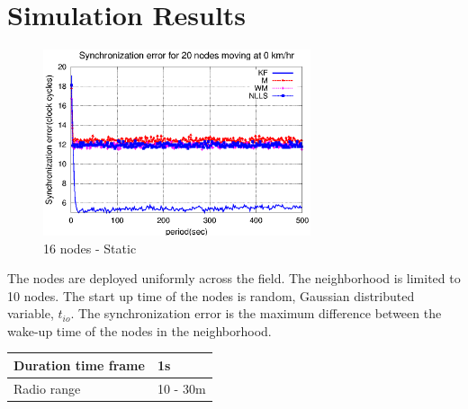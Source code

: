 \documentclass[a4paper,10pt]{report}
\begin{document}
\section{\textbf{Simulation Results}}
\begin{figure}[!h]
\centering
\includegraphics[width=0.7\textwidth]{16output-s0}
\caption{16 nodes - Static} \label{16output0}
\end{figure}
The nodes are deployed uniformly across the field. The neighborhood is limited to 10 nodes. The start up time of the nodes is random, Gaussian distributed variable, $t_{io}$. The synchronization error is the maximum difference between the wake-up time of the nodes in the neighborhood.
\newline
\begin{center}
    \begin{tabular}{ | l | l |}
    \hline
    Duration time frame & 1s \\ \hline
    Radio range & 10 - 30m \\ \hline
    \end{tabular}
\end{center}
\end{document}
